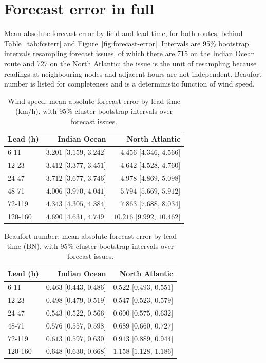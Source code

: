 \documentclass[review,authoryear]{elsarticle}
\begin{document}
\clearpage

\section{Forecast error in full}
\label{app:fcsterr}

Mean absolute forecast error by field and lead time, for both routes, behind
Table~\ref{tab:fcsterr} and Figure~\ref{fig:forecast-error}. Intervals are 95\% bootstrap
intervals resampling forecast issues, of which there are 715 on the Indian Ocean route and 727 on
the North Atlantic; the issue is the unit of resampling because readings at neighbouring nodes and
adjacent hours are not independent. Beaufort number is listed for completeness and is a
deterministic function of wind speed.

\begin{table}[H]
\centering
\caption{Wind speed: mean absolute forecast error by lead time (km/h), with 95\%
cluster-bootstrap intervals over forecast issues.}
\label{tab:fe-wind-speed-10m-kmh}
\begin{tabular}{lrr}
\toprule
Lead (h) & Indian Ocean & North Atlantic \\
\midrule
6-11 & $3.201$ [$3.159$, $3.242$] & $4.456$ [$4.346$, $4.566$] \\
12-23 & $3.412$ [$3.377$, $3.451$] & $4.642$ [$4.528$, $4.760$] \\
24-47 & $3.712$ [$3.677$, $3.746$] & $4.978$ [$4.869$, $5.098$] \\
48-71 & $4.006$ [$3.970$, $4.041$] & $5.794$ [$5.669$, $5.912$] \\
72-119 & $4.343$ [$4.305$, $4.384$] & $7.863$ [$7.688$, $8.034$] \\
120-160 & $4.690$ [$4.631$, $4.749$] & $10.216$ [$9.992$, $10.462$] \\
\bottomrule
\end{tabular}
\end{table}

\begin{table}[H]
\centering
\caption{Beaufort number: mean absolute forecast error by lead time (BN), with 95\%
cluster-bootstrap intervals over forecast issues.}
\label{tab:fe-beaufort-number}
\begin{tabular}{lrr}
\toprule
Lead (h) & Indian Ocean & North Atlantic \\
\midrule
6-11 & $0.463$ [$0.443$, $0.486$] & $0.522$ [$0.493$, $0.551$] \\
12-23 & $0.498$ [$0.479$, $0.519$] & $0.547$ [$0.523$, $0.579$] \\
24-47 & $0.543$ [$0.522$, $0.566$] & $0.600$ [$0.575$, $0.632$] \\
48-71 & $0.576$ [$0.557$, $0.598$] & $0.689$ [$0.660$, $0.727$] \\
72-119 & $0.613$ [$0.597$, $0.630$] & $0.913$ [$0.889$, $0.944$] \\
120-160 & $0.648$ [$0.630$, $0.668$] & $1.158$ [$1.128$, $1.186$] \\
\bottomrule
\end{tabular}
\end{table}
\end{document}
